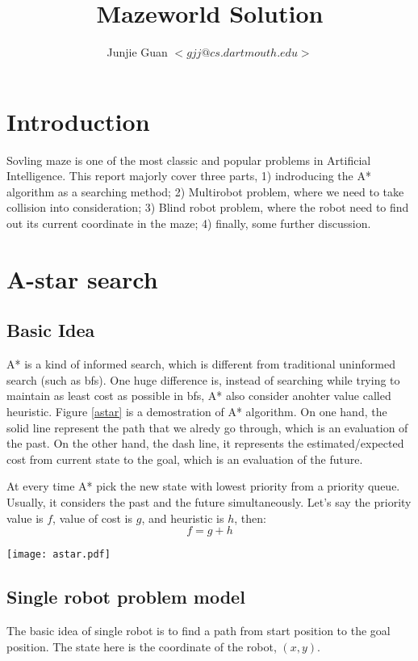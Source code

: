 \documentclass{article}
\title{Mazeworld Solution}
\author{Junjie Guan $<gjj@cs.dartmouth.edu>$}
\begin{document}
\maketitle

\tableofcontents

\section{Introduction}

Sovling maze is one of the most classic and popular problems in Artificial Intelligence. This report majorly cover three parts, 1) indroducing the A* algorithm as a searching method; 2) Multirobot problem, where we need to take collision into consideration; 3) Blind robot problem, where the robot need to find out its current coordinate in the maze; 4) finally, some further discussion.

\clearpage
\section{A-star search}
\subsection{Basic Idea}

A* is a kind of informed search, which is different from traditional uninformed search (such as bfs). One huge difference is, instead of searching while trying to maintain as least cost as possible in bfs, A* also consider anohter value called heuristic. Figure \ref{astar} is a demostration of A* algorithm. On one hand, the solid line represent the path that we alredy go through, which is an evaluation of the past. On the other hand, the dash line, it represents the estimated/expected cost from current state to the goal, which is an evaluation of the future.

At every time A* pick the new state with lowest priority from a priority queue. Usually, it considers the past and the future simultaneously. Let's say the priority value is $f$, value of cost is $g$, and heuristic is $h$, then:
$$f = g + h$$

\begin{figure*}[!h]
\centering
\texttt{[image: astar.pdf]}
\caption{A demostration of A* algorithm}
\label{astar}
\end{figure*}



\subsection{Single robot problem model}
The basic idea of single robot is to find a path from start position to the goal position. The state here is the coordinate of the robot, $(x,y)$.
\end{document}
